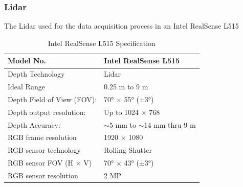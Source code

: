 \documentclass[12pt]{report}
\begin{document}
\subsubsection*{Lidar}
The Lidar used for the data acquisition process in an Intel RealSense L515




\begin{table}[H]
    \centering
    \begin{tabular}{|l|l|}
    \hline
    Model No.                  & Intel RealSense L515               \\ \hline
    Depth Technology           & Lidar                              \\ \hline
    Ideal Range                & 0.25 m to 9 m                      \\ \hline
    Depth Field of View (FOV): & 70° × 55° (±3°)                    \\ \hline
    Depth output resolution:   & Up to 1024 × 768                   \\ \hline
    Depth Accuracy:            & $\sim$5 mm to $\sim$14 mm thru 9 m \\ \hline
    RGB frame resolution       & 1920 × 1080                        \\ \hline
    RGB sensor technology      & Rolling Shutter                    \\ \hline
    RGB sensor FOV (H × V)     & 70° × 43° (±3°)                    \\ \hline
    RGB sensor resolution      & 2 MP                               \\ \hline
    \end{tabular}
    \caption{Intel RealSense L515 Specification}
    \label{tab:lidar_specs}
\end{table}

\end{document}
